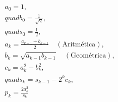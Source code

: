 \documentclass[preview]{standalone}
\begin{document}
\begin{align*}
a_0 = 1, \\quad b_0 = \frac{1}{\sqrt{2}}, \\quad s_0 = \frac{1}{2}, \\a_k = \frac{a_{k-1} + b_{k-1}}{2} \quad (\text{Aritmética}), \\b_k = \sqrt{a_{k-1} b_{k-1}} \quad (\text{Geométrica}), \\c_k = a_k^2 - b_k^2, \\quad s_k = s_{k-1} - 2^k c_k, \\p_k = \frac{2 a_k^2}{s_k}
\end{align*}
\end{document}
